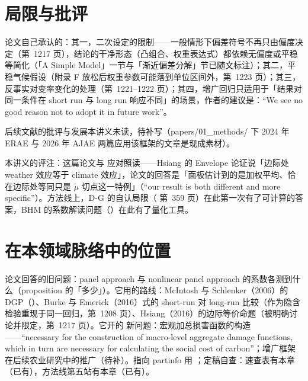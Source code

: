 \section{局限与批评}

论文自己承认的：其一，二次设定的限制——一般情形下偏差符号不再只由偏度决定（第~1217 页），结论的干净形态（凸组合、权重表达式）都依赖无偏度或平稳等简化（「A Simple Model」一节与「渐近偏差分解」节已随文标注）；其二，平稳气候假设（附录 F 放松后权重参数可能落到单位区间外，第~1223 页）；其三，反事实对变率变化的处理（第~1221--1222 页）；其四，增广回归只适用于「结果对同一条件在 short run 与 long run 响应不同」的场景，作者的建议是：``We see no good reason not to adopt it in future work''\citep[第~1236 页]{merel2021climate}。

后续文献的批评与发展本讲义未读，待补写（papers/01\_methods/ 下 2024 年 ERAE 与 2026 年 AJAE 两篇应用该框架的文章是现成素材）。

本讲义的评注：这篇论文与  应对照读——Hsiang 的 Envelope 论证说「边际处 weather 效应等于 climate 效应」，论文的回答是「面板估计到的是加权平均、恰在边际处等同只是 $\widetilde{\mu}$ 切点这一特例」（``our result is both different and more specific''\citep[第~1217 页]{merel2021climate}）。方法线上，D-G 的自认局限（ 第~359 页）在此第一次有了可计算的答案，BHM 的系数解读问题（）在此有了量化工具。

\section{在本领域脉络中的位置}

论文回答的旧问题：panel approach 与 nonlinear panel approach 的系数各测到什么（proposition 的「多少」）。它用的路线：McIntosh 与 Schlenker（2006）的 DGP（\citealp{mcintosh2006identifying}）、Burke 与 Emerick（2016）式的 short-run 对 long-run 比较（作为隐含检验重现于同一回归，第~1208 页）、Hsiang（2016）的边际等价命题（被明确讨论并限定，第~1217 页）。它开的 新问题：宏观加总损害函数的构造——``necessary for the construction of macro-level aggregate damage functions, which in turn are necessary for calculating the social cost of carbon''\citep[第~1235 页]{merel2021climate}；增广框架在后续农业研究中的推广（待补）。指向 partinfo 用 ；定稿自查：速查表有本章（已有），方法线第五站有本章（已有）。


\chapterrefs
